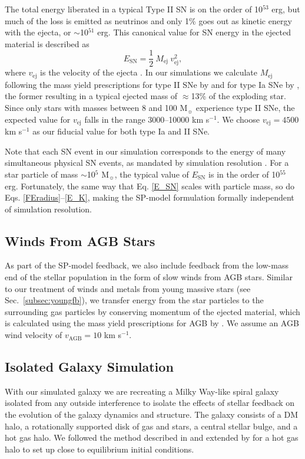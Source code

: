 \documentclass[iop]{emulateapj}
\begin{document}
The total energy liberated in a typical Type II SN is on the order of 10$^{53}$ erg, but much of the loss is emitted as neutrinos and only 1\% goes out as kinetic energy with the ejecta, or $\sim$10$^{51}$ erg. This canonical value for SN energy in the ejected material is described as
\begin{equation}\label{E_SN}
  E_{\mathrm{SN}} = \frac{1}{2}\ M_{\mathrm{ej}}\ v_{\mathrm{ej}}^2,
\end{equation}
where $v_{\mathrm{ej}}$ is the velocity of the ejecta \citep{Janka07}. In our simulations we calculate $M_{\mathrm{ej}}$ following the mass yield prescriptions for type II SNe by \citet{Woosley95} and for type Ia SNe by \citet{Iwamoto99}, the former resulting in a typical ejected mass of $\approx$13\% of the exploding star. Since only stars with masses between 8 and 100 M$_{\sun}$ experience type II SNe, the expected value for $v_{\mathrm{ej}}$ falls in the range 3000--10000 km s$^{-1}$. We choose $v_{\mathrm{ej}}=4500$ km s$^{-1}$ as our fiducial value for both type Ia and II SNe.

Note that each SN event in our simulation corresponds to the energy of many simultaneous physical SN events, as mandated by simulation resolution \citep[see, however,][for dwarf galaxy simulations resolving individual SNe]{Hu15}. For a star particle of mass $\sim$10$^5$ M$_{\sun}$, the typical value of $E_{\mathrm{SN}}$ is in the order of 10$^{55}$ erg. Fortunately, the same way that Eq. \ref{E_SN} scales with particle mass, so do Eqs. \ref{FEradius}--\ref{E_K}, making the SP-model formulation formally independent of simulation resolution.

\subsection{Winds From AGB Stars}\label{subsec:AGB}
As part of the SP-model feedback, we also include feedback from the low-mass end of the stellar population in the form of slow winds from AGB stars. Similar to our treatment of winds and metals from young massive stars (see Sec.~\ref{subsec:youngfb}), we transfer energy from the star particles to the surrounding gas particles by conserving momentum of the ejected material, which is calculated using the mass yield prescriptions for AGB by \citet{Karakas10}. We assume an AGB wind velocity of $v_{\mathrm{AGB}}=10$ km s$^{-1}$.

\subsection{Isolated Galaxy Simulation}\label{subsec:isolated}
With our simulated galaxy we are recreating a Milky Way-like spiral galaxy isolated from any outside interference to isolate the effects of stellar feedback on the evolution of the galaxy dynamics and structure. The galaxy consists of a DM halo, a rotationally supported disk of gas and stars, a central stellar bulge, and a hot gas halo. We followed the method described in \citet{Springel05a} and extended by \citet{Moster11} for a hot gas halo to set up close to equilibrium initial conditions.
\end{document}
